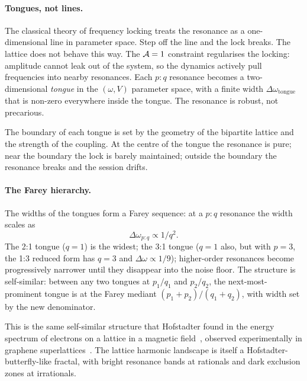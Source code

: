\paragraph{Tongues, not lines.}
The classical theory of frequency locking treats the resonance as a
one-dimensional line in parameter space. Step off the line and the
lock breaks. The lattice does not behave this way. The
$\mathcal{A}=1$ constraint regularises the locking: amplitude cannot leak
out of the system, so the dynamics actively pull frequencies into
nearby resonances. Each $p:q$ resonance becomes a two-dimensional
\emph{tongue} in the $(\omega, V)$ parameter space, with a finite
width
$\Delta\omega_\text{tongue}$ that is non-zero everywhere inside the
tongue. The resonance is robust, not precarious.

The boundary of each tongue is set by the geometry of the bipartite
lattice and the strength of the coupling. At the centre of the
tongue the resonance is pure; near the boundary the lock is barely
maintained; outside the boundary the resonance breaks and the
session drifts.

\paragraph{The Farey hierarchy.}
The widths of the tongues form a Farey sequence: at a $p:q$ resonance
the width scales as
\begin{equation}
    \Delta\omega_{p:q} \propto 1/q^2.
    \label{eq:farey_width}
\end{equation}
The 2:1 tongue ($q = 1$) is the widest; the 3:1 tongue ($q = 1$
also, but with $p=3$, the 1:3 reduced form has $q = 3$ and
$\Delta\omega \propto 1/9$); higher-order resonances become
progressively narrower until they disappear into the noise floor.
The structure is self-similar: between any two tongues at $p_1/q_1$
and $p_2/q_2$, the next-most-prominent tongue is at the Farey
mediant $(p_1 + p_2)/(q_1 + q_2)$, with width set by the new
denominator.

This is the same self-similar structure that Hofstadter found in
the energy spectrum of electrons on a lattice in a magnetic
field~\cite{hofstadter1976}, observed experimentally in graphene
superlattices~\cite{dean2013}. The lattice harmonic landscape is
itself a Hofstadter-butterfly-like fractal, with bright resonance
bands at rationals and dark exclusion zones at irrationals.

